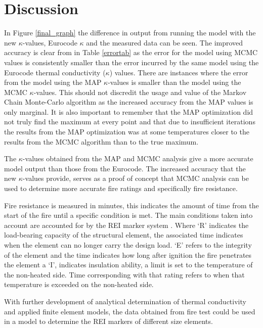 \chapter{Discussion} \label{discussion}

In Figure \ref{final_graph} the difference in output from running the model with the new $\kappa$-values, Eurocode $\kappa$ and the measured data can be seen. 
The improved accuracy is clear from in Table \ref{errortab} as the error for the model using MCMC values is consistently smaller than the error incurred by the same model using the Eurocode thermal conductivity ($\kappa$) values.
There are instances where the error from the model using the MAP $\kappa$-values is smaller than the model using the MCMC $\kappa$-values. 
This should not discredit the usage and value of the Markov Chain Monte-Carlo algorithm as the increased accuracy from the MAP values is only marginal.
It is also important to remember that the MAP optimization did not truly find the maximum at every point and that due to insufficient iterations the results from the MAP optimization was at some temperatures closer to the results from the MCMC algorithm than to the true maximum.


The $\kappa$-values obtained from the MAP and MCMC analysis give a more accurate model output than those from the Eurocode.
The increased accuracy that the new $\kappa$-values provide, serves as a proof of concept that MCMC analysis can be used to determine more accurate fire ratings and specifically fire resistance. 

Fire resistance is measured in minutes, this indicates the amount of time from the start of the fire until a specific condition is met. 
The main conditions taken into account are accounted for by the REI marker system \citep{rei:2021}. 
Where `R' indicates the load-bearing capacity of the structural element, the associated time indicates when the element can no longer carry the design load.
`E' refers to the integrity of the element and the time indicates how long after ignition the fire penetrates the element a `I', indicates insulation ability, a limit is set to the temperature of the non-heated side.
Time corresponding with that rating refers to when that temperature is exceeded on the non-heated side.

With further development of analytical determination of thermal conductivity and applied finite element models, the data obtained from fire test could be used in a model to determine the REI markers of different size elements.

